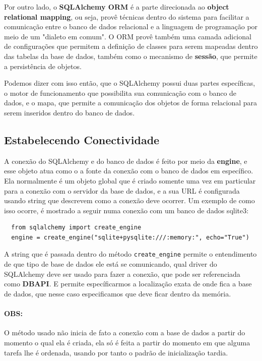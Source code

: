 \documentclass[12pt, a4paper]{paper}
\begin{document}
Por outro lado, o \textbf{SQLAlchemy ORM} é a parte direcionada ao 
\textbf{object relational mapping}, ou seja, provê técnicas dentro do sistema para 
facilitar a comunicação entre o banco de dados relacional e a linguagem de programação 
por meio de um "dialeto em comum". O ORM provê também uma camada adicional de 
configurações que permitem a definição de classes para serem mapeadas dentro das 
tabelas da base de dados, também como o mecanismo de \textbf{sessão}, que permite 
a persistência de objetos.

Podemos dizer com isso então, que o SQLAlchemy possui duas partes específicas, o motor 
de funcionamento que possibilita sua comunicação com o banco de dados, e o mapa, que 
permite a comunicação dos objetos de forma relacional para serem inseridos dentro do 
banco de dados.

\subsection{Estabelecendo Conectividade} %
\label{sub:Estabelecendo Conectividade}
A conexão do SQLAlchemy e do banco de dados é feito por meio da \textbf{engine}, e esse 
objeto atua como o a fonte da conexão com o banco de dados em específico. Ela 
normalmente é um objeto global que é criado somente uma vez em particular para a 
conexão com o servidor da base de dados, e a sua URL é configurada usando string que 
descrevem como a conexão deve ocorrer. Um exemplo de como isso ocorre, é mostrado a 
seguir numa conexão com um banco de dados sqlite3: 

\begin{verbatim}
  from sqlalchemy import create_engine
  engine = create_engine("sqlite+pysqlite:///:memory:", echo="True")
\end{verbatim}

A string que é passada dentro do método \texttt{create\_engine} permite o entendimento 
de que tipo de base de dados ele está se comunicando, qual driver do SQLAlchemy deve 
ser usado para fazer a conexão, que pode ser referenciada como \textbf{DBAPI}. E 
permite específicarmos a localização exata de onde fica a base de dados, que nesse 
caso especificamos que deve ficar dentro da memória. 

\paragraph{OBS:} %
\label{par:OBS:}
O método usado não inicia de fato a conexão com a base de dados a partir do momento o 
qual ela é criada, ela só é feita a partir do momento em que alguma tarefa lhe é 
ordenada, usando por tanto o padrão de inicialização tardia.
\end{document}
